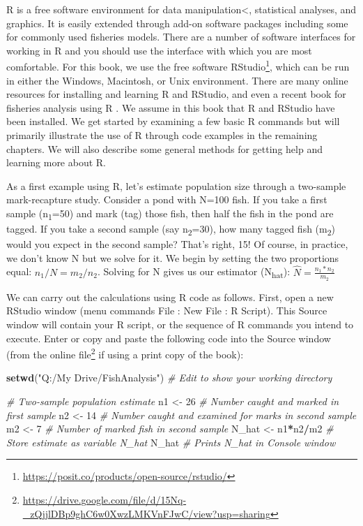 \documentclass[
]{krantz}
\makeatletter
\newenvironment{Shaded}{\begin{snugshade}}{\end{snugshade}}
\newcommand{\CommentTok}[1]{\textcolor[rgb]{0.37,0.37,0.37}{\textit{#1}}}
\newcommand{\DecValTok}[1]{\textcolor[rgb]{0.06,0.06,0.06}{#1}}
\newcommand{\FunctionTok}[1]{\textcolor[rgb]{0.27,0.27,0.27}{\textbf{#1}}}
\newcommand{\NormalTok}[1]{#1}
\newcommand{\OtherTok}[1]{\textcolor[rgb]{0.37,0.37,0.37}{#1}}
\newcommand{\SpecialCharTok}[1]{\textcolor[rgb]{0.43,0.43,0.43}{\textbf{#1}}}
\newcommand{\StringTok}[1]{\textcolor[rgb]{0.5,0.5,0.5}{#1}}
\renewcommand{\href}[2]{#2\footnote{\url{#1}}}
\newenvironment{kframe}{%
\medskip{}
\setlength{\fboxsep}{.8em}
 \def\at@end@of@kframe{}%
 \ifinner\ifhmode%
  \def\at@end@of@kframe{\end{minipage}}%
  \begin{minipage}{\columnwidth}%
 \fi\fi%
 \def\FrameCommand##1{\hskip\@totalleftmargin \hskip-\fboxsep
 \colorbox{shadecolor}{##1}\hskip-\fboxsep
     \hskip-\linewidth \hskip-\@totalleftmargin \hskip\columnwidth}%
 \MakeFramed {\advance\hsize-\width
   \@totalleftmargin\z@ \linewidth\hsize
   \@setminipage}}%
 {\par\unskip\endMakeFramed%
 \at@end@of@kframe}
\renewenvironment{Shaded}{\begin{kframe}}{\end{kframe}}
\makeatother
\begin{document}
R \citep{R-base} is a free software environment for data manipulation\textless, statistical analyses, and graphics. It is easily extended through add-on software packages including some for commonly used fisheries models. There are a number of software interfaces for working in R and you should use the interface with which you are most comfortable. For this book, we use the free software \href{https://posit.co/products/open-source/rstudio/}{RStudio}, which can be run in either the Windows, Macintosh, or Unix environment. There are many online resources for installing and learning R and RStudio, and even a recent book for fisheries analysis using R \citep{ogle_2018}. We assume in this book that R and RStudio have been installed. We get started by examining a few basic R commands but will primarily illustrate the use of R through code examples in the remaining chapters. We will also describe some general methods for getting help and learning more about R.

As a first example using R, let's estimate population size through a two-sample mark-recapture study. Consider a pond with N=100 fish. If you take a first sample (n\textsubscript{1}=50) and mark (tag) those fish, then half the fish in the pond are tagged. If you take a second sample (say n\textsubscript{2}=30), how many tagged fish (m\textsubscript{2}) would you expect in the second sample? That's right, 15! Of course, in practice, we don't know N but we solve for it. We begin by setting the two proportions equal: \(n_1/N=m_2/n_2\). Solving for N gives us our estimator (N\textsubscript{hat}): \(\hat{N} = \frac{n_1*n_2}{m_2}\)

We can carry out the calculations using R code as follows. First, open a new RStudio window (menu commands File : New File : R Script). This Source window will contain your R script, or the sequence of R commands you intend to execute. Enter or copy and paste the following code into the Source window (from the online \href{https://drive.google.com/file/d/15Nq-_zQjjlDBp9ghC6w0XwzLMKVnFJwC/view?usp=sharing}{file} if using a print copy of the book):

\begin{Shaded}
\begin{Highlighting}[]
\FunctionTok{setwd}\NormalTok{(}\StringTok{"Q:/My Drive/FishAnalysis"}\NormalTok{) }\CommentTok{\# Edit to show your working directory}

\CommentTok{\# Two{-}sample population estimate}
\NormalTok{n1 }\OtherTok{\textless{}{-}} \DecValTok{26} \CommentTok{\# Number caught and marked in first sample}
\NormalTok{n2 }\OtherTok{\textless{}{-}} \DecValTok{14} \CommentTok{\# Number caught and examined for marks in second sample}
\NormalTok{m2 }\OtherTok{\textless{}{-}} \DecValTok{7} \CommentTok{\# Number of marked fish in second sample}
\NormalTok{N\_hat }\OtherTok{\textless{}{-}}\NormalTok{ n1}\SpecialCharTok{*}\NormalTok{n2}\SpecialCharTok{/}\NormalTok{m2 }\CommentTok{\# Store estimate as variable N\_hat}
\NormalTok{N\_hat }\CommentTok{\# Prints N\_hat in Console window}
\end{Highlighting}
\end{Shaded}
\end{document}
